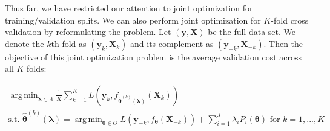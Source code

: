 \documentclass[12pt,letterpaper]{article}
\DeclareMathOperator*{\argmin}{arg\,min}
\begin{document}
\begin{algorithm}
\begin{algorithmic}
	\ENDFOR
  \end{algorithmic}
\end{algorithm}

Thus far, we have restricted our attention to joint optimization for training/validation splits. We can also perform joint optimization for $K$-fold cross validation by reformulating the problem. Let $(\boldsymbol y, \boldsymbol{X})$ be the full data set. We denote the $k$th fold as $(\boldsymbol y_{k}, \boldsymbol{X}_{k})$ and its complement as $(\boldsymbol y_{-k}, \boldsymbol{X}_{-k})$. Then the objective of this joint optimization problem is the average validation cost across all $K$ folds:

\begin{equation}
\begin{array}{c}
\argmin_{\boldsymbol{\lambda} \in \Lambda} \frac{1}{K} \sum_{k=1}^K L(\boldsymbol{y}_{k}, f_{\hat{\boldsymbol \theta}^{(k)}(\boldsymbol{\lambda})}(\boldsymbol{X}_k)) \\
\text{s.t. } {\hat{\boldsymbol \theta}^{(k)}(\boldsymbol{\lambda})} = \argmin_{\boldsymbol \theta \in \Theta} L(\boldsymbol{y}_{-k}, f_{\boldsymbol \theta} (\boldsymbol{X}_{-k})) + \sum\limits_{i=1}^J \lambda_i P_i(\boldsymbol \theta) \text{ for } k=1,...,K
\end{array}
\label{jointoptFullCV}
\end{equation}
\end{document}
